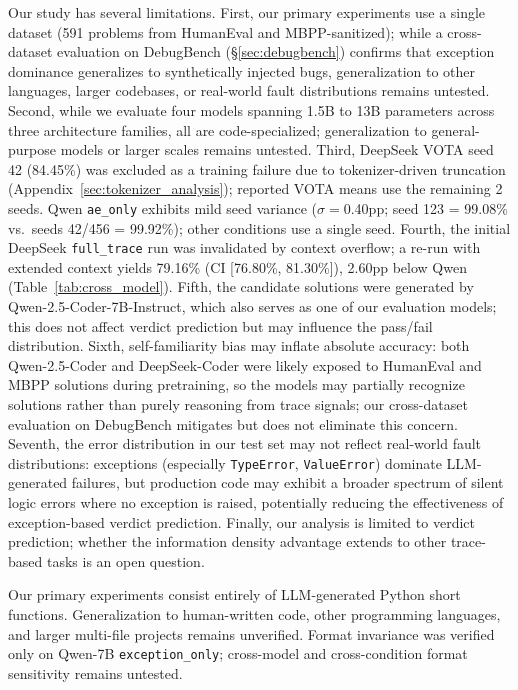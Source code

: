 \documentclass[11pt,a4paper]{article}
\begin{document}
Our study has several limitations.
First, our primary experiments use a single dataset (591 problems from HumanEval and MBPP-sanitized); while a cross-dataset evaluation on DebugBench (\S\ref{sec:debugbench}) confirms that exception dominance generalizes to synthetically injected bugs, generalization to other languages, larger codebases, or real-world fault distributions remains untested.
Second, while we evaluate four models spanning 1.5B to 13B parameters across three architecture families, all are code-specialized; generalization to general-purpose models or larger scales remains untested.
Third, DeepSeek VOTA seed 42 (84.45\%) was excluded as a training failure due to tokenizer-driven truncation (Appendix~\ref{sec:tokenizer_analysis}); reported VOTA means use the remaining 2 seeds.
Qwen \texttt{ae\_only} exhibits mild seed variance ($\sigma{=}$0.40pp; seed 123 = 99.08\% vs.\ seeds 42/456 = 99.92\%); other conditions use a single seed.
Fourth, the initial DeepSeek \texttt{full\_trace} run was invalidated by context overflow; a re-run with extended context yields 79.16\% (CI [76.80\%, 81.30\%]), 2.60pp below Qwen (Table~\ref{tab:cross_model}).
Fifth, the candidate solutions were generated by Qwen-2.5-Coder-7B-Instruct, which also serves as one of our evaluation models; this does not affect verdict prediction but may influence the pass/fail distribution.
Sixth, self-familiarity bias may inflate absolute accuracy: both Qwen-2.5-Coder and DeepSeek-Coder were likely exposed to HumanEval and MBPP solutions during pretraining, so the models may partially recognize solutions rather than purely reasoning from trace signals; our cross-dataset evaluation on DebugBench mitigates but does not eliminate this concern.
Seventh, the error distribution in our test set may not reflect real-world fault distributions: exceptions (especially \texttt{TypeError}, \texttt{ValueError}) dominate LLM-generated failures, but production code may exhibit a broader spectrum of silent logic errors where no exception is raised, potentially reducing the effectiveness of exception-based verdict prediction.
Finally, our analysis is limited to verdict prediction; whether the information density advantage extends to other trace-based tasks is an open question.

Our primary experiments consist entirely of LLM-generated Python short functions. Generalization to human-written code,
other programming languages, and larger multi-file projects remains unverified.
Format invariance was verified only on Qwen-7B \texttt{exception\_only}; cross-model and cross-condition
format sensitivity remains untested.
\end{document}
